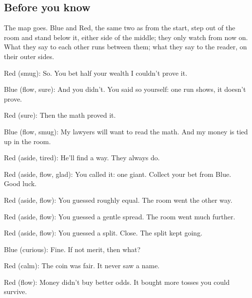 
\subsection{Before you know}\label{act:veil}

\label{bet}

The map goes. Blue and Red, the same two as from the start, step out of the
room and stand below it, either side of the middle; they only watch from now
on. What they say to each other runs between them; what they say to the reader,
on their outer sides.


Red (smug): So. You bet half your wealth I couldn't prove it.

Blue (flow, sure): And you didn't. You said so yourself:
one run shows, it doesn't prove.

Red (sure): Then the math proved it.

Blue (flow, smug): My lawyers will want to read the math.
And my money is tied up in the room.

Red (aside, tired): He'll find a way.
They always do.


Red (aside, flow, glad): You called it: one giant.
Collect your bet from Blue. Good luck.

Red (aside, flow): You guessed roughly equal.
The room went the other way.

Red (aside, flow): You guessed a gentle spread.
The room went much further.

Red (aside, flow): You guessed a split.
Close. The split kept going.

Blue (curious): Fine. If not merit, then what?

Red (calm): The coin was fair. It never saw a name.

Red (flow): Money didn't buy better odds.
It bought more tosses you could survive.

